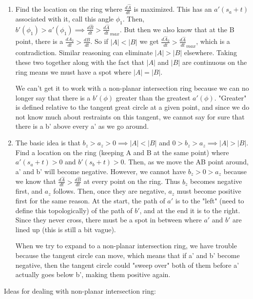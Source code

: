 \documentclass[12pt]{article}
\begin{document}
\begin{enumerate}[resume]
\item Find the location on the ring where $\frac{d\hat{A}}{dt}$ is maximized. This has an $a'(s_a+t)$ associated with it, call this angle $\phi_1$. Then, $b'(\phi_1) > a'(\phi_1) \implies \frac{d\hat{B}}{dt} > \frac{d\hat{A}}{dt}_{max}$. But then we also know that at the B point, there is a $\frac{dA_2}{dt} > \frac{dB}{dt}$. So if $|A| < |B|$ we get $\frac{d\hat{A}_2}{dt} > \frac{d\hat{A}}{dt}_{max}$, which is a contradiction. Similar reasoning can eliminate $|A| > |B|$ elsewhere. Taking these two together along with the fact that $|A|$ and $|B|$ are continuous on the ring means we must have a spot where $|A|=|B|$.

We can't get it to work with a non-planar intersection ring because we can no longer say that there is a $b'(\phi)$ greater than the greatest $a'(\phi)$. "Greater" is defined relative to the tangent great circle at a given point, and since we do not know much about restraints on this tangent, we cannot say for sure that there is a b' above every a' as we go around.

\item The basic idea is that $b_z > a_z > 0 \implies |A| < |B|$ and $0 > b_z > a_z \implies |A| > |B|$. Find a location on the ring (keeping A and B at the same point) where $a'(s_a+t)>0$ and $b'(s_b+t)>0$. Then, as we move the AB point around, a' and b' will become negative. However, we cannot have $b_z > 0 > a_z$ because we know that $\frac{d\hat{A}}{dt} > \frac{d\hat{B}}{dt}$ at every point on the ring. Thus $b_z$ becomes negative first, and $a_z$ follows. Then, once they are negative, $a_z$ must become positive first for the same reason. At the start, the path of $a'$ is to the "left" (need to define this topologically) of the path of $b'$, and at the end it is to the right. Since they never cross, there must be a spot in between where $a'$ and $b'$ are lined up (this is still a bit vague).

When we try to expand to a non-planar intersection ring, we have trouble because the tangent circle can move, which means that if a' and b' become negative, then the tangent circle could "sweep over" both of them before a' actually goes below b', making them positive again.
\end{enumerate}

Ideas for dealing with non-planar intersection ring:
\end{document}
